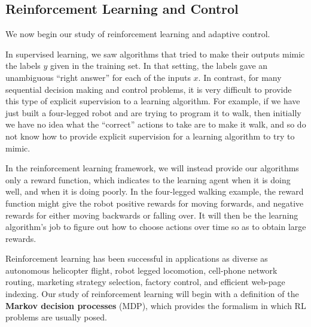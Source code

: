 \titlespacing*{\part}{0pt}{-20pt}{30pt} %
\titlespacing*{\chapter}{0pt}{-10pt}{30pt}

\begin{fullwidth}
\part{Reinforcement Learning and Control}
\label{part:rl}
\end{fullwidth}


We now begin our study of reinforcement learning and adaptive control.

In supervised learning, we saw algorithms that tried to make their outputs
mimic the labels $y$ given in the training set. In that setting, the labels gave
an unambiguous ``right answer'' for each of the inputs $x$. In contrast, for
many sequential decision making and control problems, it is very difficult to
provide this type of explicit supervision to a learning algorithm. For example,
if we have just built a four-legged robot and are trying to program it to walk,
then initially we have no idea what the ``correct'' actions to take are to make
it walk, and so do not know how to provide explicit supervision for a learning
algorithm to try to mimic.

In the reinforcement learning framework, we will instead provide our
algorithms only a reward function, which indicates to the learning agent when
it is doing well, and when it is doing poorly. In the four-legged walking
example, the reward function might give the robot positive rewards for
moving forwards, and negative rewards for either moving backwards or falling
over. It will then be the learning algorithm's job to figure out how to choose
actions over time so as to obtain large rewards.

Reinforcement learning has been successful in applications as diverse as
autonomous helicopter flight, robot legged locomotion, cell-phone network
routing, marketing strategy selection, factory control, and efficient web-page
indexing. Our study of reinforcement learning will begin with a definition of
the \textbf{Markov decision processes} (MDP), which provides the formalism in
which RL problems are usually posed.

